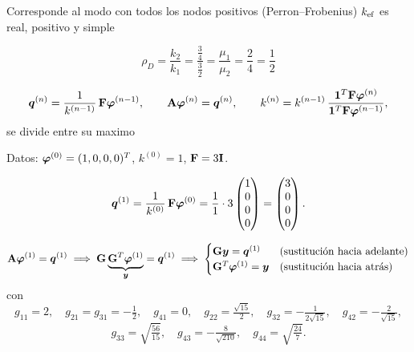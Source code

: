 Corresponde al modo con todos los nodos positivos (Perron--Frobenius) $k_{\mathrm{ef}}$ es real, positivo y simple

\[
\rho_D = \frac{k_2}{k_1} = \frac{\frac34}{\frac32} = \frac{\mu_1}{\mu_2} = \frac24 = \frac12
\]


\[
\bm{q}^{(n)} = \frac{1}{k^{(n-1)}}\,\mathbf{F}\bm{\varphi}^{(n-1)},
\qquad
\mathbf{A}\bm{\varphi}^{(n)} = \bm{q}^{(n)},
\qquad
k^{(n)} = k^{(n-1)}\,\frac{\bm{1}^T\mathbf{F}\bm{\varphi}^{(n)}}{\bm{1}^T\mathbf{F}\bm{\varphi}^{(n-1)}},
\]
se divide entre su maximo

Datos: $\bm{\varphi}^{(0)} = (1, 0, 0, 0)^T$, $k^{(0)} = 1$, $\mathbf{F} = 3\mathbf{I}$.

\[
\bm{q}^{(1)} = \frac{1}{k^{(0)}}\,\mathbf{F}\bm{\varphi}^{(0)} = \frac11\cdot 3\begin{pmatrix} 1\\ 0\\ 0\\ 0 \end{pmatrix}
= \begin{pmatrix} 3\\ 0\\ 0\\ 0 \end{pmatrix}.
\]

\[
\mathbf{A}\bm{\varphi}^{(1)} = \bm{q}^{(1)}
\;\Longrightarrow\;
\mathbf{G}\underbrace{\mathbf{G}^T\bm{\varphi}^{(1)}}_{\bm{y}} = \bm{q}^{(1)}
\;\Longrightarrow\;
\begin{cases}
	\mathbf{G}\bm{y} = \bm{q}^{(1)} & \text{(sustitución hacia adelante)}\\
	\mathbf{G}^T\bm{\varphi}^{(1)} = \bm{y} & \text{(sustitución hacia atrás)}
\end{cases}
\]
con
\[
g_{11} = 2,\quad g_{21} = g_{31} = -\tfrac12,\quad g_{41} = 0,\quad g_{22} = \tfrac{\sqrt{15}}{2},\quad
g_{32} = -\tfrac{1}{2\sqrt{15}},\quad g_{42} = -\tfrac{2}{\sqrt{15}},
\]
\[
g_{33} = \sqrt{\tfrac{56}{15}},\quad g_{43} = -\tfrac{8}{\sqrt{210}},\quad g_{44} = \sqrt{\tfrac{24}{7}} .
\]

